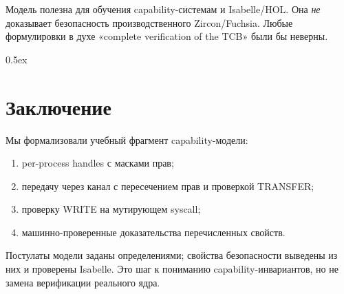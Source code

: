 \documentclass[11pt,a4paper]{article}
\begin{document}
Модель полезна для обучения capability-системам и Isabelle/HOL. Она
\emph{не} доказывает безопасность производственного Zircon/Fuchsia. Любые
формулировки в духе «complete verification of the TCB» были бы неверны.

\clearpage

\tableofcontents

\clearpage

\parindent 0pt\parskip 0.5ex



\clearpage

\section{Заключение}

Мы формализовали учебный фрагмент capability-модели:
\begin{enumerate}
  \item per-process handles с масками прав;
  \item передачу через канал с пересечением прав и проверкой TRANSFER;
  \item проверку WRITE на мутирующем syscall;
  \item машинно-проверенные доказательства перечисленных свойств.
\end{enumerate}

Постулаты модели заданы определениями; свойства безопасности выведены из них
и проверены Isabelle. Это шаг к пониманию capability-инвариантов, но не
замена верификации реального ядра.

\clearpage

\nocite{*}


\end{document}
